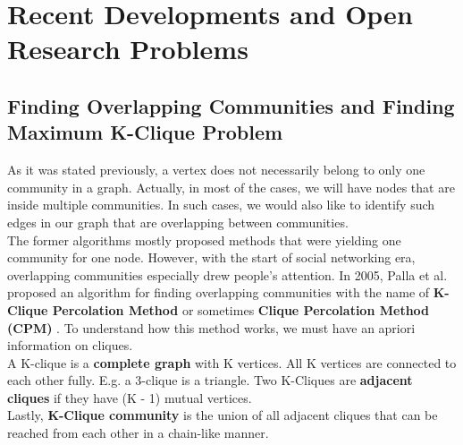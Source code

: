\documentclass[10pt]{article}
\begin{document}
\section{Recent Developments and Open Research Problems}

\subsection{Finding Overlapping Communities and Finding Maximum K-Clique Problem}

As it was stated previously, a vertex does not necessarily belong to only one community in a graph. Actually, in most of the cases, we will have nodes that are inside multiple communities. In such cases, we would also like to identify such edges in our graph that are overlapping between communities. \\

The former algorithms mostly proposed methods that were yielding one community for one node. However, with the start of social networking era, overlapping communities especially drew people’s attention. In 2005, Palla et al. proposed an algorithm for finding overlapping communities with the name of \textbf{ K-Clique Percolation Method } or sometimes \textbf{ Clique Percolation Method (CPM) }. To understand how this method works, we must have an apriori information on cliques. \\

A K-clique is a \textbf{complete graph} with K vertices. All K vertices are connected to each other fully. E.g. a 3-clique is a triangle.
Two K-Cliques are \textbf{adjacent cliques} if they have (K - 1) mutual vertices. \\

Lastly, \textbf{K-Clique community} is the union of all adjacent cliques that can be reached from each other in a chain-like manner. \\

\begin{figure}[h]%
    \centering
    \qquad
\end{figure}
\end{document}
